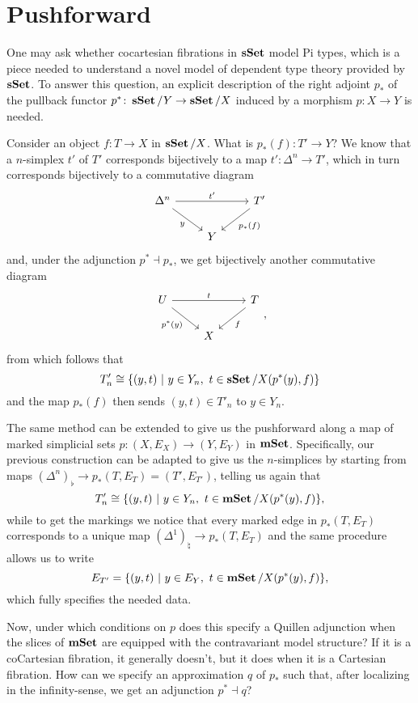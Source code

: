 \chapter*{Pushforward}

One may ask whether cocartesian fibrations in $\operatorname{\mathbf{sSet}}$ model Pi types, which is a
piece needed to understand a novel model of dependent type theory provided by
$\operatorname{\mathbf{sSet}}$. To answer this question, an explicit description of the right adjoint
$p_*$ of the pullback functor $p^*\colon\operatorname{\mathbf{sSet}}/Y\rightarrow\operatorname{\mathbf{sSet}}/X$ induced by a
morphism $p\colon X\rightarrow Y$ is needed.

Consider an object $f\colon T\rightarrow X$ in $\operatorname{\mathbf{sSet}}/X$. What is $p_*(f)\colon
T'\rightarrow Y$? We know that a $n$-simplex $t'$ of $T'$ corresponds
bijectively to a map $t'\colon\Delta^n\rightarrow T'$, which in turn corresponds
bijectively to a commutative diagram
\[\begin{tikzcd}
	{\Delta^n} & {} & {T'} \\
	& Y
	\arrow["{t'}", from=1-1, to=1-3]
	\arrow["y"', from=1-1, to=2-2]
	\arrow["{p_*(f)}", from=1-3, to=2-2]
\end{tikzcd}\]
and, under the adjunction $p^*\dashv p_*$, we get bijectively another
commutative diagram
\[\begin{tikzcd}
	U & {} & T \\
	& X
	\arrow["t", from=1-1, to=1-3]
	\arrow["{p^*(y)}"', from=1-1, to=2-2]
	\arrow["f", from=1-3, to=2-2]
\end{tikzcd},\]
from which follows that
\[T'_n\cong\{(y,t)\ |\ y\in Y_n,\ t\in\sSet/X(p^*(y),f)\}\]
and the map $p_*(f)$ then sends $(y,t)\in T'_n$ to $y\in Y_n$.

The same method can be extended to give us the pushforward along a map of marked
simplicial sets $p\colon (X,E_X)\rightarrow (Y,E_Y)$ in $\operatorname{\mathbf{mSet}}$. Specifically,
our previous construction can be adapted to give us the $n$-simplices by
starting from maps $(\Delta^n)_\flat\rightarrow p_*(T,E_T)=(T',E_{T'})$, telling
us again that
\[T'_n\cong\{(y,t)\ |\ y\in Y_n,\ t\in\mSet/X(p^*(y),f)\},\]
while to get the markings we notice that every marked edge in $p_*(T,E_T)$
corresponds to a unique map $(\Delta^1)_\natural\rightarrow p_*(T,E_T)$ and the
same procedure allows us to write
\[E_{T'}=\{(y,t)\ |\ y\in E_Y,\ t\in\mSet/X(p^*(y),f)\},\]
which fully specifies the needed data.

Now, under which conditions on $p$ does this specify a Quillen adjunction when
the slices of $\operatorname{\mathbf{mSet}}$ are equipped with the contravariant model structure? If
it is a coCartesian fibration, it generally doesn't, but it does when it is a
Cartesian fibration. How can we specify an approximation $q$ of $p_*$ such that,
after localizing in the infinity-sense, we get an adjunction $p^*\dashv q$?

